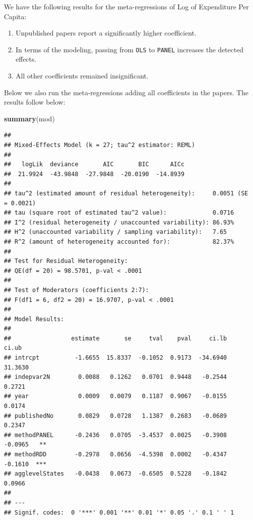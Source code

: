 \documentclass[
]{article}
\newenvironment{Shaded}{\begin{snugshade}}{\end{snugshade}}
\newcommand{\KeywordTok}[1]{\textcolor[rgb]{0.13,0.29,0.53}{\textbf{#1}}}
\newcommand{\NormalTok}[1]{#1}
\providecommand{\tightlist}{%
  \setlength{\itemsep}{0pt}\setlength{\parskip}{0pt}}
\begin{document}
We have the following results for the meta-regressions of Log of
Expenditure Per Capita:

\begin{enumerate}
\def\labelenumi{\arabic{enumi}.}
\tightlist
\item
  Unpublished papers report a significantly higher coefficient.
\item
  In terms of the modeling, passing from \texttt{OLS} to \texttt{PANEL}
  increases the detected effects.
\item
  All other coefficients remained insignificant.
\end{enumerate}

Below we also run the meta-regressions adding all coefficients in the
papers. The results follow below:

\begin{Shaded}
\begin{Highlighting}[]
\KeywordTok{summary}\NormalTok{(mod)}
\end{Highlighting}
\end{Shaded}

\begin{verbatim}
## 
## Mixed-Effects Model (k = 27; tau^2 estimator: REML)
## 
##   logLik  deviance       AIC       BIC      AICc 
##  21.9924  -43.9848  -27.9848  -20.0190  -14.8939   
## 
## tau^2 (estimated amount of residual heterogeneity):     0.0051 (SE = 0.0021)
## tau (square root of estimated tau^2 value):             0.0716
## I^2 (residual heterogeneity / unaccounted variability): 86.93%
## H^2 (unaccounted variability / sampling variability):   7.65
## R^2 (amount of heterogeneity accounted for):            82.37%
## 
## Test for Residual Heterogeneity:
## QE(df = 20) = 98.5701, p-val < .0001
## 
## Test of Moderators (coefficients 2:7):
## F(df1 = 6, df2 = 20) = 16.9707, p-val < .0001
## 
## Model Results:
## 
##                 estimate       se     tval    pval     ci.lb    ci.ub 
## intrcpt          -1.6655  15.8337  -0.1052  0.9173  -34.6940  31.3630      
## indepvar2N        0.0088   0.1262   0.0701  0.9448   -0.2544   0.2721      
## year              0.0009   0.0079   0.1187  0.9067   -0.0155   0.0174      
## publishedNo       0.0829   0.0728   1.1387  0.2683   -0.0689   0.2347      
## methodPANEL      -0.2436   0.0705  -3.4537  0.0025   -0.3908  -0.0965   ** 
## methodRDD        -0.2978   0.0656  -4.5398  0.0002   -0.4347  -0.1610  *** 
## agglevelStates   -0.0438   0.0673  -0.6505  0.5228   -0.1842   0.0966      
## 
## ---
## Signif. codes:  0 '***' 0.001 '**' 0.01 '*' 0.05 '.' 0.1 ' ' 1
\end{verbatim}
\end{document}
